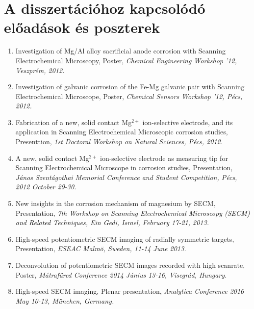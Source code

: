 \documentclass[11pt,a4paper,roman]{article}
\begin{document}
\section{A disszertációhoz kapcsolódó előadások és poszterek}
\begin{enumerate}
\item Investigation of Mg/Al alloy sacrificial anode corrosion with Scanning Electrochemical Microscopy, Poster, \emph{Chemical Engineering Workshop ’12, Veszprém, 2012.}

\item Investigation of galvanic corrosion of the Fe-Mg galvanic pair with Scanning Electrochemical Microscope, Poster, \emph{Chemical Sensors Workshop ’12, Pécs, 2012.}

\item Fabrication of a new, solid contact Mg$^{2+}$ ion-selective electrode, and its application in Scanning Electrochemical Microscopic corrosion studies, Presenttion, \emph{1st Doctoral Workshop on Natural Sciences, Pécs, 2012.}

\item A new, solid contact Mg$^{2+}$ ion-selective electrode as measuring tip for Scanning Electrochemical Microscope in corrosion studies, Presentation, \emph{János Szentágothai Memorial Conference and Student Competition, Pécs, 2012 October 29-30.}

\item New insights in the corrosion mechanism of magnesium by SECM, Presentation, \emph{7th Workshop on Scanning Electrochemical Microscopy (SECM) and Related Techniques, Ein Gedi, Israel, February 17-21, 2013.}

\item High-speed potentiometric SECM imaging of radially symmetric targets, Presentation, \emph{ESEAC Malmö, Sweden, 11-14 June 2013.}

\item Deconvolution of potentiometric SECM images recorded with high scanrate, Poster, \emph{Mátrafüred Conference 2014 Június 13-16, Visegrád, Hungary.}

\item High-speed SECM imaging, Plenar presentation, \emph{Analytica Conference 2016 May 10-13, München, Germany.}
\end{enumerate}
\end{document}
